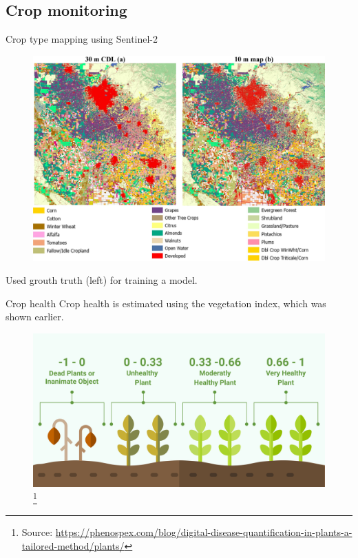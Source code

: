 \documentclass[aspectratio=169]{beamer} %
\begin{document}
    \subsection{Crop monitoring}
        \begin{frame}{Crop type mapping using Sentinel-2}
      
      \noindent\begin{minipage}{0.68\textwidth}
        \begin{figure}
          \includegraphics[width = 1\linewidth]{crop.jpg}
        \end{figure}
      \end{minipage}%
      \hfill%
      \begin{minipage}{0.3\textwidth}\raggedright
        Used grouth truth (left) for training a model. 

      \end{minipage} 
    \end{frame}
    \begin{frame}{Crop health}
      Crop health is estimated using the vegetation index, which was shown earlier. 
      \begin{figure}
        \includegraphics[width = 0.7\linewidth]{plants.png}\footnote{Source: \url{https://phenospex.com/blog/digital-disease-quantification-in-plants-a-tailored-method/plants/}}
      \end{figure}
    \end{frame}
\end{document}
